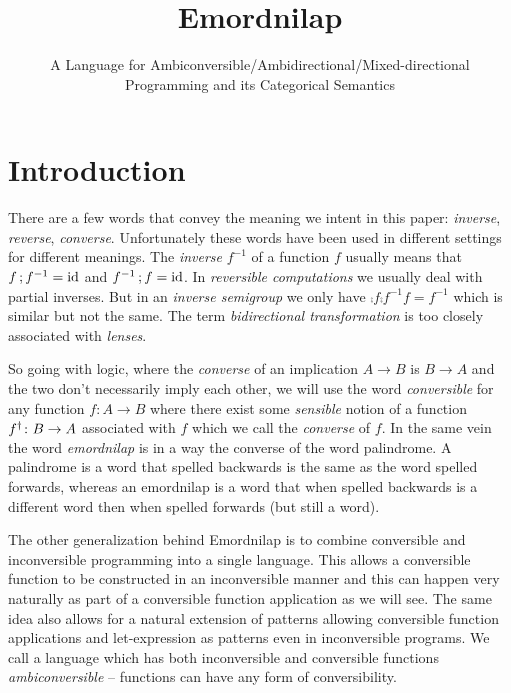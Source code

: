 \documentclass[runningheads,envcountsame]{llncs}
\begin{document}
\title{Emordnilap}
\subtitle{A Language for Ambiconversible/Ambidirectional/Mixed-directional Programming and its Categorical Semantics}

\maketitle

\section{Introduction}

There are a few words that convey the meaning we intent in this paper: \emph{inverse}, \emph{reverse}, \emph{converse}. Unfortunately these words have been used in different settings for different meanings. The \emph{inverse} $f^{-1}$ of a function $f$ usually means that $\comp{f}{f^{-1}} = \id$ and $\comp{f^{-1}}{f} = \id$. In \emph{reversible computations} we usually deal with partial inverses. But in an \emph{inverse semigroup} we only have $\comp{f}{\comp{f^{-1}}{f}} = f^{-1}$ which is similar but not the same. The term \emph{bidirectional transformation} is too closely associated with \emph{lenses}.

So going with logic, where the \emph{converse} of an implication $A \to B$ is $B \to A$ and the two don't necessarily imply each other, we will use the word \emph{conversible} for any function $f\colon A \to B$ where there exist some \emph{sensible} notion of a function $\rev{f}\colon B \to A$ associated with $f$ which we call the \emph{converse} of $f$. In the same vein the word \emph{emordnilap} is in a way the converse of the word palindrome. A palindrome is a word that spelled backwards is the same as the word spelled forwards, whereas an emordnilap is a word that when spelled backwards is a different word then when spelled forwards (but still a word).

The other generalization behind Emordnilap is to combine conversible and inconversible programming into a single language. This allows a conversible function to be constructed in an inconversible manner and this can happen very naturally as part of a conversible function application as we will see. The same idea also allows for a natural extension of patterns allowing conversible function applications and let-expression as patterns even in inconversible programs. We call a language which has both inconversible and conversible functions \emph{ambiconversible} -- functions can have any form of conversibility.
\end{document}
